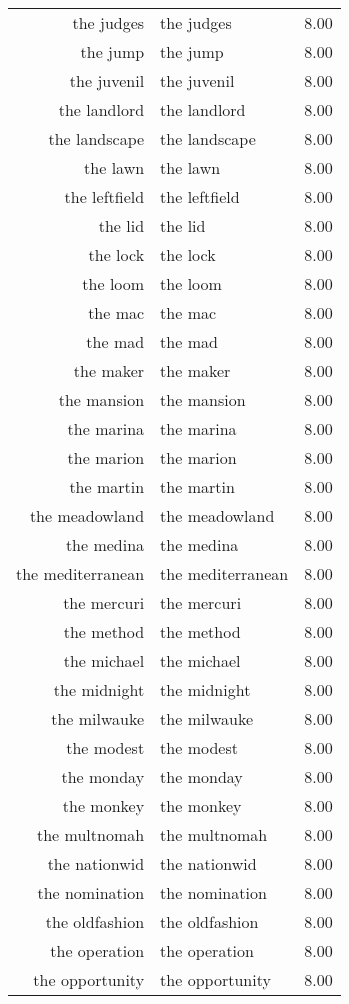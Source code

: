 \begin{table}[ht]
\begin{tabular}{rlr}
  the judges & the judges & 8.00 \\ 
  the jump & the jump & 8.00 \\ 
  the juvenil & the juvenil & 8.00 \\ 
  the landlord & the landlord & 8.00 \\ 
  the landscape & the landscape & 8.00 \\ 
  the lawn & the lawn & 8.00 \\ 
  the leftfield & the leftfield & 8.00 \\ 
  the lid & the lid & 8.00 \\ 
  the lock & the lock & 8.00 \\ 
  the loom & the loom & 8.00 \\ 
  the mac & the mac & 8.00 \\ 
  the mad & the mad & 8.00 \\ 
  the maker & the maker & 8.00 \\ 
  the mansion & the mansion & 8.00 \\ 
  the marina & the marina & 8.00 \\ 
  the marion & the marion & 8.00 \\ 
  the martin & the martin & 8.00 \\ 
  the meadowland & the meadowland & 8.00 \\ 
  the medina & the medina & 8.00 \\ 
  the mediterranean & the mediterranean & 8.00 \\ 
  the mercuri & the mercuri & 8.00 \\ 
  the method & the method & 8.00 \\ 
  the michael & the michael & 8.00 \\ 
  the midnight & the midnight & 8.00 \\ 
  the milwauke & the milwauke & 8.00 \\ 
  the modest & the modest & 8.00 \\ 
  the monday & the monday & 8.00 \\ 
  the monkey & the monkey & 8.00 \\ 
  the multnomah & the multnomah & 8.00 \\ 
  the nationwid & the nationwid & 8.00 \\ 
  the nomination & the nomination & 8.00 \\ 
  the oldfashion & the oldfashion & 8.00 \\ 
  the operation & the operation & 8.00 \\ 
  the opportunity & the opportunity & 8.00 \\ 

\end{tabular}
\end{table}

